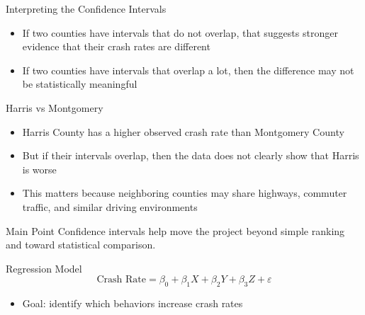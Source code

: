 \documentclass[
  ignorenonframetext,
  aspectratio=169]{beamer}
\providecommand{\tightlist}{%
  \setlength{\itemsep}{0pt}\setlength{\parskip}{0pt}}
\begin{document}
\begin{frame}{Interpreting the Confidence Intervals}
\label{interpreting-the-confidence-intervals}
\begin{itemize}
\tightlist
\item
  If two counties have intervals that do not overlap, that suggests
  stronger evidence that their crash rates are different
\item
  If two counties have intervals that overlap a lot, then the difference
  may not be statistically meaningful
\end{itemize}

\begin{block}{Harris vs Montgomery}
\label{harris-vs-montgomery}
\begin{itemize}
\tightlist
\item
  Harris County has a higher observed crash rate than Montgomery County
\item
  But if their intervals overlap, then the data does not clearly show
  that Harris is worse
\item
  This matters because neighboring counties may share highways, commuter
  traffic, and similar driving environments
\end{itemize}
\end{block}

\begin{block}{Main Point}
\label{main-point}
Confidence intervals help move the project beyond simple ranking and
toward statistical comparison.
\end{block}
\end{frame}

\begin{frame}{Regression Model}
\label{regression-model}
\[
\text{Crash Rate} = \beta_0 + \beta_1 X + \beta_2 Y + \beta_3 Z + \varepsilon
\]

\begin{itemize}
\tightlist
\item
  Goal: identify which behaviors increase crash rates
\end{itemize}
\end{frame}
\end{document}
